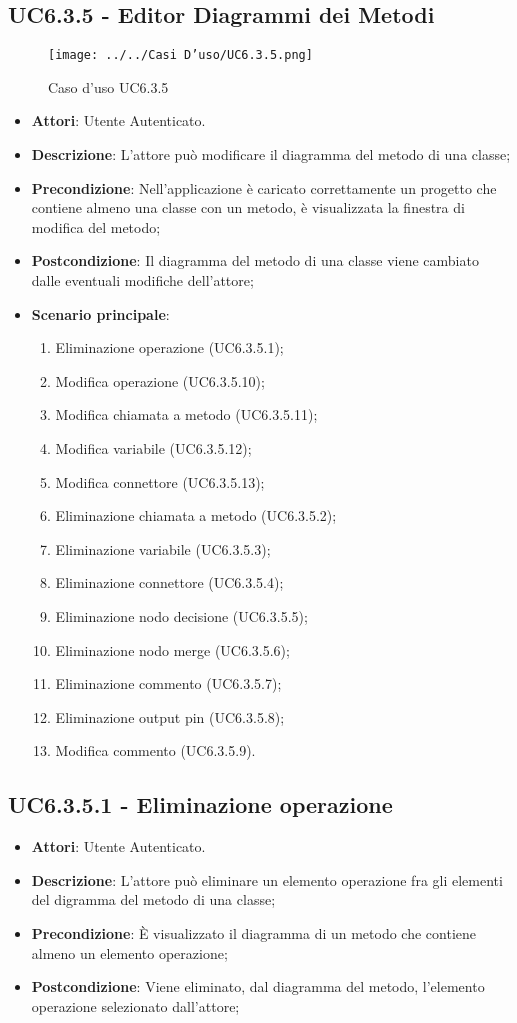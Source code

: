 \subsection{UC6.3.5 - Editor Diagrammi dei Metodi} 
\label{ssec:UC6.3.5} 
\begin{figure}[h!] 
\centering 
\texttt{[image: ../../Casi D'uso/UC6.3.5.png]} 
\caption{Caso d'uso UC6.3.5} 
 \end{figure} 
\begin{itemize} 
\item \textbf{Attori}: Utente Autenticato.
\item \textbf{Descrizione}: L'attore può modificare il diagramma del metodo di una classe;
\item \textbf{Precondizione}: Nell'applicazione è caricato correttamente un progetto che  contiene almeno una classe con un metodo, è visualizzata la finestra di modifica del metodo;
\item \textbf{Postcondizione}: Il diagramma del metodo di una classe viene cambiato dalle eventuali modifiche dell'attore;
\item \textbf{Scenario principale}: \begin{enumerate}\item Eliminazione operazione (UC6.3.5.1);\item Modifica operazione (UC6.3.5.10);\item Modifica chiamata a metodo (UC6.3.5.11);\item Modifica variabile (UC6.3.5.12);\item Modifica connettore (UC6.3.5.13);\item Eliminazione chiamata a metodo (UC6.3.5.2);\item Eliminazione variabile (UC6.3.5.3);\item Eliminazione connettore (UC6.3.5.4);\item Eliminazione nodo decisione (UC6.3.5.5);\item Eliminazione nodo merge (UC6.3.5.6);\item Eliminazione commento (UC6.3.5.7);\item Eliminazione output pin (UC6.3.5.8);\item Modifica commento (UC6.3.5.9). 
 \end{enumerate}
\end{itemize} 
\subsection{UC6.3.5.1 - Eliminazione operazione} 
\label{ssec:UC6.3.5.1} 
\begin{itemize} 
\item \textbf{Attori}: Utente Autenticato.
\item \textbf{Descrizione}: L'attore può eliminare un elemento operazione fra gli elementi del digramma del metodo di una classe;
\item \textbf{Precondizione}: È visualizzato il diagramma di un metodo che contiene almeno un elemento operazione;
\item \textbf{Postcondizione}: Viene eliminato, dal diagramma del metodo,  l'elemento operazione selezionato dall'attore;
\end{itemize} 
